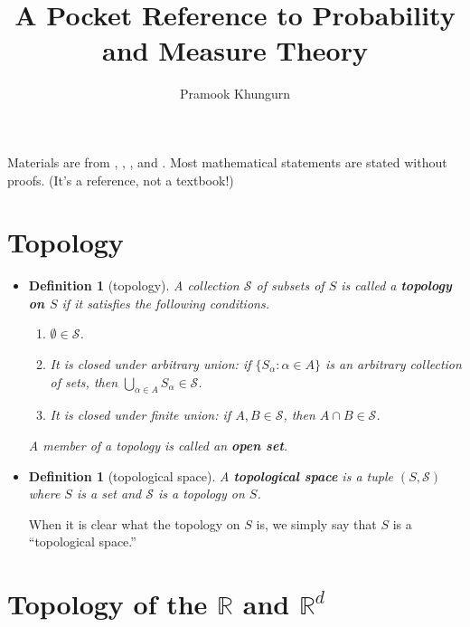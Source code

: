 \documentclass[10pt]{article}
\title{A Pocket Reference to Probability and Measure Theory}
\author{Pramook Khungurn}
\newtheorem{definition}[lemma]{Definition}
\numberwithin{lemma}{section}
\newcommand{\mcal}[1]{\mathcal{#1}}
\newcommand{\Real}{\mathbb{R}}
\begin{document}
\maketitle

Materials are from \cite{Bartle:1995}, \cite{Jacod:2004}, \cite{Williams:1991}, and \cite{Schilling:2017}. Most mathematical statements are stated without proofs. (It's a reference, not a textbook!)

\section{Topology}

\begin{itemize}
  \item \begin{definition}[topology]
    A collection $\mcal{S}$ of subsets of $S$ is called a {\bf topology on $S$} if it satisfies the following conditions.
    \begin{enumerate}
      \item $\emptyset \in \mcal{S}$.
      \item It is closed under arbitrary union: if $\{ S_\alpha : \alpha \in A \}$ is an arbitrary collection of sets, then $\bigcup_{\alpha \in A} S_\alpha \in \mcal{S}$.
      \item It is closed under finite union: if $A, B \in \mcal{S}$, then $A \cap B \in \mcal{S}$.
    \end{enumerate}
    A member of a topology is called an {\bf open set}.
  \end{definition}

  \item \begin{definition}[topological space]
    A {\bf topological space} is a tuple $(S, \mcal{S})$ where $S$ is a set and $\mcal{S}$ is a topology on $S$.
  \end{definition}
  When it is clear what the topology on $S$ is, we simply say that $S$ is a ``topological space.''
\end{itemize}

\section{Topology of the $\Real$ and $\Real^d$}
\end{document}
